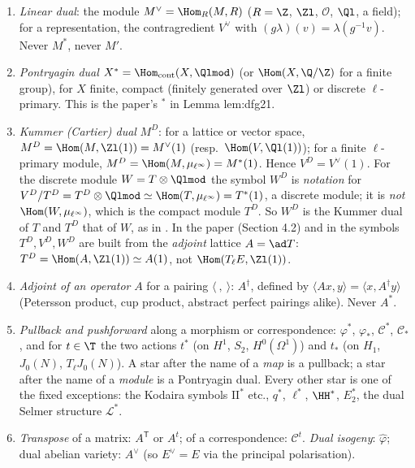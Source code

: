 \begin{convention}\label{conv:notation:bc4}
\leavevmode
\begin{enumerate}[label=(\alph*)]
\item \emph{Linear dual}: the module $M^\vee=\Hom_R(M,R)$ ($R=\Z$, $\Zl$, $\mathcal O$, $\Ql$, a field); for a representation, the contragredient
$V^\vee$ with $(g\lambda)(v)=\lambda(g^{-1}v)$. Never $M^*$, never $M'$.
\item \emph{Pontryagin dual} $X^*=\Hom_{\mathrm{cont}}(X,\Qlmod)$ (or $\Hom(X,\Q/\Z)$ for a finite group), for $X$ finite, compact
(finitely generated over $\Zl$) or discrete $\ell$-primary. This is the paper's ${}^*$ in Lemma lem:dfg21.
\item \emph{Kummer (Cartier) dual} $M^D$: for a lattice or vector space, $M^D=\Hom(M,\Zl(1))=M^\vee(1)$ (resp.\ $\Hom(V,\Ql(1))$); for a finite
$\ell$-primary module, $M^D=\Hom(M,\mu_{\ell^\infty})=M^*(1)$. Hence $V^D=V^\vee(1)$. For the discrete module $W=T\otimes\Qlmod$ the symbol $W^D$
is \emph{notation} for $V^D/T^D=T^D\otimes\Qlmod\simeq\Hom(T,\mu_{\ell^\infty})=T^*(1)$, a discrete module; it is \emph{not}
$\Hom(W,\mu_{\ell^\infty})$, which is the compact module $T^D$. So $W^D$ is the Kummer dual of $T$ and $T^D$ that of $W$, as in
. In
the paper (Section 4.2) and in  the symbols $T^D,V^D,W^D$ are built from the
\emph{adjoint} lattice $A=\ad T$: $T^D=\Hom(A,\Zl(1))\simeq A(1)$, not $\Hom(T_\ell E,\Zl(1))$.
\item \emph{Adjoint of an operator} $A$ for a pairing $\langle\ ,\ \rangle$: $A^\dagger$, defined by $\langle Ax,y\rangle=\langle x,A^\dagger y\rangle$
(Petersson product, cup product, abstract perfect pairings alike). Never $A^*$.
\item \emph{Pullback and pushforward} along a morphism or correspondence: $\varphi^*$, $\varphi_*$, $\mathcal C^*$, $\mathcal C_*$, and for
$t\in\T$ the two actions $t^*$ (on $H^1$, $S_2$, $H^0(\Omega^1)$) and $t_*$ (on $H_1$, $J_0(N)$, $T_\ell J_0(N)$). A star after the name of a
\emph{map} is a pullback; a star after the name of a \emph{module} is a Pontryagin dual. Every other star is one of the fixed
exceptions: the Kodaira symbols $\mathrm{II}^*$ etc., $q^*$, $\ell^*$, $\HH^*$, $E_2^*$, the dual Selmer structure $\mathcal L^*$.
\item \emph{Transpose} of a matrix: $A^{\mathsf T}$ or $A^t$; of a correspondence: $\mathcal C^t$. \emph{Dual isogeny}: $\hat\varphi$; dual
abelian variety: $A^\vee$ (so $E^\vee=E$ via the principal polarisation).
\end{enumerate}
\end{convention}

